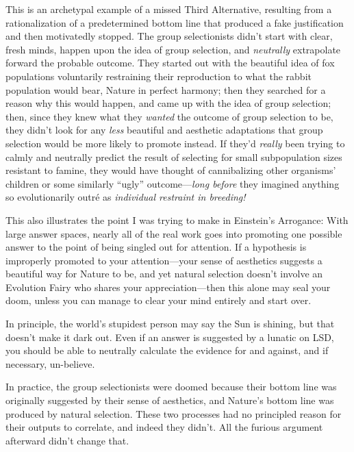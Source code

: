  This is an archetypal example of a missed Third Alternative,
resulting from a rationalization of a predetermined bottom line that
produced a fake justification and then motivatedly stopped. The group
selectionists didn't start with clear, fresh minds,
happen upon the idea of group selection, and \textit{neutrally}
extrapolate forward the probable outcome. They started out with the
beautiful idea of fox populations voluntarily restraining their
reproduction to what the rabbit population would bear, Nature in
perfect harmony; then they searched for a reason why this would happen,
and came up with the idea of group selection; then, since they knew
what they \textit{wanted} the outcome of group selection to be, they
didn't look for any \textit{less} beautiful and
aesthetic adaptations that group selection would be more likely to
promote instead. If they'd \textit{really} been trying
to calmly and neutrally predict the result of selecting for small
subpopulation sizes resistant to famine, they would have thought of
cannibalizing other organisms' children or some
similarly ``ugly''
outcome---\textit{long before} they imagined anything so evolutionarily
outré as \textit{individual restraint in breeding!}


 This also illustrates the point I was trying to make in
Einstein's Arrogance: With large answer spaces, nearly
all of the real work goes into promoting one possible answer to the
point of being singled out for attention. If a hypothesis is improperly
promoted to your attention---your sense of aesthetics suggests a
beautiful way for Nature to be, and yet natural selection
doesn't involve an Evolution Fairy who shares your
appreciation---then this alone may seal your doom, unless you can
manage to clear your mind entirely and start over.


 In principle, the world's stupidest person may say
the Sun is shining, but that doesn't make it dark out.
Even if an answer is suggested by a lunatic on LSD, you should be able
to neutrally calculate the evidence for and against, and if necessary,
un-believe.


 In practice, the group selectionists were doomed because their
bottom line was originally suggested by their sense of aesthetics, and
Nature's bottom line was produced by natural selection.
These two processes had no principled reason for their outputs to
correlate, and indeed they didn't. All the furious
argument afterward didn't change that.


